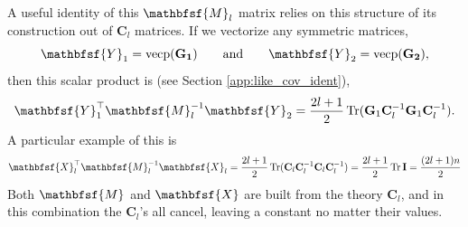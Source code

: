 A useful identity of this $\mathbfsf{M}_l$ matrix relies on this structure of its construction out of $\mathbf{C}_l$ matrices.  If we vectorize any symmetric matrices,
\begin{equation}
  \mathbfsf{Y}_1 = \textrm{vecp}(\mathbf{G_1}) \qquad \mbox{and} \qquad  \mathbfsf{Y}_2 = \textrm{vecp}(\mathbf{G_2}),
\end{equation}
then this scalar product is (see Section \ref{app:like_cov_ident}),
\begin{equation}
  \mathbfsf{Y}_1^\top \mathbfsf{M}_l^{-1} \mathbfsf{Y}_2 = \frac{2l+1}{2} \Tr (\mathbf{G}_1 \mathbf{C}^{-1}_l\mathbf{G}_1 \mathbf{C}^{-1}_l). \label{eqn:magic_vecp_M_identity}
\end{equation}
A particular example of this is
\begin{equation}
  \mathbfsf{X}_l^\top \mathbfsf{M}_l^{-1} \mathbfsf{X}_l = \frac{2l+1}{2} \Tr (\mathbf{C}_l \mathbf{C}^{-1}_l\mathbf{C}_l \mathbf{C}^{-1}_l) = \frac{2l+1}{2} \Tr \mathbf{I} = \frac{(2l+1)n}{2} 
\end{equation}
Both $\mathbfsf{M}$ and $\mathbfsf{X}$ are built from the theory $\mathbf{C}_l$, and in this combination the $\mathbf{C}_l$'s all cancel, leaving a constant no matter their values.

